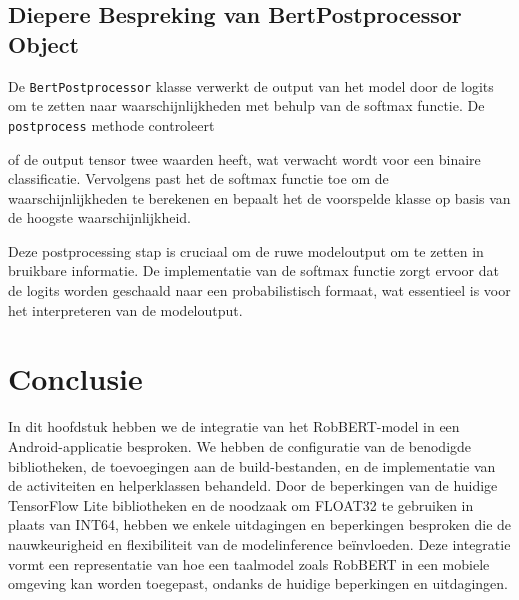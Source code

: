 \subsection{Diepere Bespreking van BertPostprocessor Object}

De \texttt{BertPostprocessor} klasse verwerkt de output van het model door de logits om te zetten naar waarschijnlijkheden met behulp van de softmax functie. De \texttt{postprocess} methode controleert

of de output tensor twee waarden heeft, wat verwacht wordt voor een binaire classificatie. Vervolgens past het de softmax functie toe om de waarschijnlijkheden te berekenen en bepaalt het de voorspelde klasse op basis van de hoogste waarschijnlijkheid.

Deze postprocessing stap is cruciaal om de ruwe modeloutput om te zetten in bruikbare informatie. De implementatie van de softmax functie zorgt ervoor dat de logits worden geschaald naar een probabilistisch formaat, wat essentieel is voor het interpreteren van de modeloutput.

\section{Conclusie}

In dit hoofdstuk hebben we de integratie van het RobBERT-model in een Android-applicatie besproken. We hebben de configuratie van de benodigde bibliotheken, de toevoegingen aan de build-bestanden, en de implementatie van de activiteiten en helperklassen behandeld. Door de beperkingen van de huidige TensorFlow Lite bibliotheken en de noodzaak om FLOAT32 te gebruiken in plaats van INT64, hebben we enkele uitdagingen en beperkingen besproken die de nauwkeurigheid en flexibiliteit van de modelinference beïnvloeden. Deze integratie vormt een representatie van hoe een taalmodel zoals RobBERT in een mobiele omgeving kan worden toegepast, ondanks de huidige beperkingen en uitdagingen.